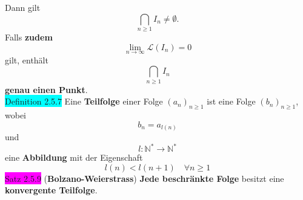 \documentclass[landscape, 10pt]{article}
\newcommand{\N}{\mathbb{N}}
\begin{document}
\begin{multicols}{3}
\begin{equation*}
                     \end{equation*}
                     Dann gilt 
                     \begin{equation*}
                            \bigcap_{n\geqslant1}I_n\neq\emptyset.
                     \end{equation*}
                     Falls \textbf{zudem}  
                     \begin{equation*}
                            \lim\limits_{n\to\infty}\mathcal{L}(I_n)=0
                     \end{equation*} 
                     gilt, enthält 
                     \begin{equation*}
                            \bigcap_{n\geqslant1}I_n
                     \end{equation*}
                     \textbf{genau einen Punkt}.\\
              \colorbox{cyan}{Definition 2.5.7} 
                     Eine \textbf{Teilfolge} einer Folge 
                     \textcolor{NavyBlue}{$(a_n)_{n\geqslant1}$}
                     ist eine Folge 
                     \textcolor{NavyBlue}{$(b_n)_{n\geqslant1}$}, 
                     wobei 
                     \begin{equation*}
                            b_n=a_{l(n)}
                     \end{equation*}
                     und 
                     \begin{equation*}
                            l:\N^{*}\longrightarrow\N^*
                     \end{equation*}
                     eine \textbf{Abbildung} mit der Eigenschaft 
                     \begin{equation*}
                            l(n)<l(n+1)\quad\forall n\geqslant1
                     \end{equation*}
              \colorbox{magenta}{Satz 2.5.9} 
              (\textbf{Bolzano-Weierstrass}) 
                     \textbf{Jede beschränkte Folge} 
                     besitzt eine \textbf{konvergente Teilfolge}.

\end{multicols}
\end{document}
